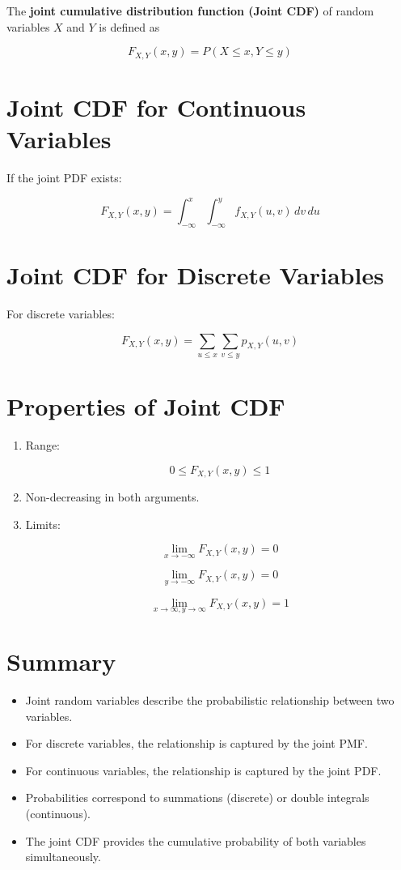 \documentclass[11pt]{article}
\begin{document}
The \textbf{joint cumulative distribution function (Joint CDF)} of random variables \(X\) and \(Y\) is defined as

\[
F_{X,Y}(x,y) = P(X \le x, Y \le y)
\]

\section{Joint CDF for Continuous Variables}

If the joint PDF exists:

\[
F_{X,Y}(x,y) =
\int_{-\infty}^{x}
\int_{-\infty}^{y}
f_{X,Y}(u,v)\,dv\,du
\]

\section{Joint CDF for Discrete Variables}

For discrete variables:

\[
F_{X,Y}(x,y) =
\sum_{u \le x}
\sum_{v \le y}
p_{X,Y}(u,v)
\]

\section{Properties of Joint CDF}

\begin{enumerate}
\item Range:

\[
0 \le F_{X,Y}(x,y) \le 1
\]

\item Non-decreasing in both arguments.

\item Limits:

\[
\lim_{x \to -\infty} F_{X,Y}(x,y) = 0
\]

\[
\lim_{y \to -\infty} F_{X,Y}(x,y) = 0
\]

\[
\lim_{x \to \infty, y \to \infty} F_{X,Y}(x,y) = 1
\]
\end{enumerate}

\section{Summary}

\begin{itemize}
\item Joint random variables describe the probabilistic relationship between two variables.
\item For discrete variables, the relationship is captured by the joint PMF.
\item For continuous variables, the relationship is captured by the joint PDF.
\item Probabilities correspond to summations (discrete) or double integrals (continuous).
\item The joint CDF provides the cumulative probability of both variables simultaneously.
\end{itemize}
\end{document}
